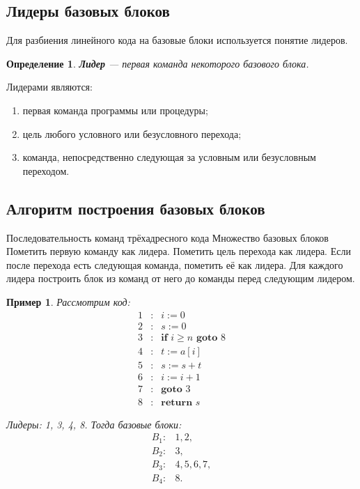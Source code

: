\documentclass[12pt,a4paper]{article}
\newtheorem{definition}{Определение}
\newtheorem{example}{Пример}
\begin{document}
\subsection{Лидеры базовых блоков}

Для разбиения линейного кода на базовые блоки используется понятие лидеров.

\begin{definition}
\textbf{Лидер} --- первая команда некоторого базового блока.
\end{definition}

Лидерами являются:
\begin{enumerate}
    \item первая команда программы или процедуры;
    \item цель любого условного или безусловного перехода;
    \item команда, непосредственно следующая за условным или безусловным переходом.
\end{enumerate}

\subsection{Алгоритм построения базовых блоков}

\begin{algorithm}[H]
\caption{Построение базовых блоков}
\begin{algorithmic}[1]
\Require Последовательность команд трёхадресного кода
\Ensure Множество базовых блоков
\State Пометить первую команду как лидера.
    \State Пометить цель перехода как лидера.
    \State Если после перехода есть следующая команда, пометить её как лидера.
\EndFor
\State Для каждого лидера построить блок из команд от него до команды перед следующим лидером.
\end{algorithmic}
\end{algorithm}

\begin{example}
Рассмотрим код:
\[
\begin{array}{rcl}
1&:& i := 0\\
2&:& s := 0\\
3&:& \textbf{if } i \geq n \textbf{ goto } 8\\
4&:& t := a[i]\\
5&:& s := s + t\\
6&:& i := i + 1\\
7&:& \textbf{goto } 3\\
8&:& \textbf{return } s
\end{array}
\]

Лидеры: 1, 3, 4, 8. Тогда базовые блоки:
\[
\begin{array}{ll}
B_1: & 1,2,\\
B_2: & 3,\\
B_3: & 4,5,6,7,\\
B_4: & 8.
\end{array}
\]
\end{example}
\end{document}
